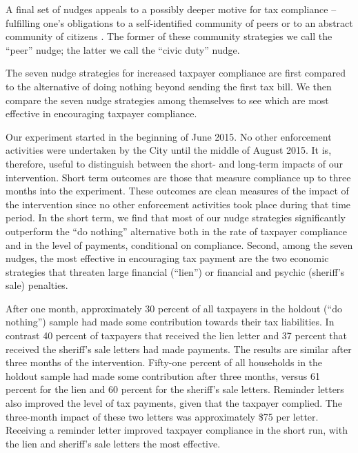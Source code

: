 \documentclass[12pt]{article}
\begin{document}
A final set of nudges appeals to a possibly deeper motive for tax
compliance -- fulfilling one's obligations to a self-identified
community of peers \cite{Posner-00} or to an abstract community of
citizens \cite{Rawls-71}.  The former of these community strategies we
call the ``peer'' nudge; the latter we call the ``civic duty'' nudge.  

The seven nudge strategies for increased taxpayer compliance are first
compared to the alternative of doing nothing beyond sending the first
tax bill.  We then compare the seven nudge strategies among themselves
to see which are most effective in encouraging taxpayer compliance.

Our experiment started in the beginning of June 2015. No other
enforcement activities were undertaken by the City until the middle of
August 2015. It is, therefore, useful to distinguish between the
short- and long-term impacts of our intervention. Short term outcomes
are those that measure compliance up to three months into the
experiment. These outcomes are clean measures of the impact of the
intervention since no other enforcement activities took place during
that time period.  In the short term, we find that most of our nudge
strategies significantly outperform the ``do nothing'' alternative
both in the rate of taxpayer compliance and in the level of payments,
conditional on compliance.  Second, among the seven nudges, the most
effective in encouraging tax payment are the two economic strategies
that threaten large financial (``lien'') or financial and psychic
(sheriff's sale) penalties.

After one month, approximately 30 percent of all taxpayers in the
holdout (``do nothing'') sample had made some contribution towards
their tax liabilities. In contrast 40 percent of taxpayers that
received the lien letter and 37 percent that received the sheriff's
sale letters had made payments. The results are similar after three
months of the intervention.  Fifty-one percent of all households in
the holdout sample had made some contribution after three months,
versus 61 percent for the lien and 60 percent for the sheriff's sale
letters. Reminder letters also improved the level of tax payments,
given that the taxpayer complied. The three-month impact of these two
letters was approximately \$75 per letter.  Receiving a reminder
letter improved taxpayer compliance in the short run, with the lien
and sheriff's sale letters the most effective.
\end{document}
